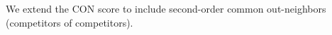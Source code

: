 \documentclass[preview]{standalone}
\begin{document}
We extend the CON score to include second-order common out-neighbors (competitors of competitors).\\
\end{document}
